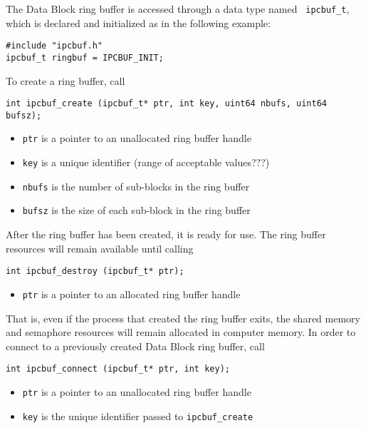 The Data Block ring buffer is accessed through a data type named {\tt
ipcbuf\_t}, which is declared and initialized as in the following
example:
\begin{verbatim}
#include "ipcbuf.h"
ipcbuf_t ringbuf = IPCBUF_INIT;
\end{verbatim}
To create a ring buffer, call
\begin{verbatim}
int ipcbuf_create (ipcbuf_t* ptr, int key, uint64 nbufs, uint64 bufsz);
\end{verbatim}
\vspace{-6mm}
\begin{itemize}
\item {\tt ptr} is a pointer to an unallocated ring buffer handle
\vspace{-2mm}
\item {\tt key} is a unique identifier (range of acceptable values???)
\vspace{-2mm}
\item {\tt nbufs} is the number of sub-blocks in the ring buffer
\vspace{-2mm}
\item {\tt bufsz} is the size of each sub-block in the ring buffer
\end{itemize}
After the ring buffer has been created, it is ready for use.   The ring
buffer resources will remain available until calling
\begin{verbatim}
int ipcbuf_destroy (ipcbuf_t* ptr);
\end{verbatim}
\vspace{-6mm}
\begin{itemize}
\item {\tt ptr} is a pointer to an allocated ring buffer handle
\end{itemize}
That is, even if the process that created the ring buffer exits, the
shared memory and semaphore resources will remain allocated in
computer memory.  In order to connect to a previously created Data
Block ring buffer, call
\begin{verbatim}
int ipcbuf_connect (ipcbuf_t* ptr, int key);
\end{verbatim}
\vspace{-6mm}
\begin{itemize}
\item {\tt ptr} is a pointer to an unallocated ring buffer handle
\vspace{-2mm}
\item {\tt key} is the unique identifier passed to {\tt ipcbuf\_create}
\end{itemize}
